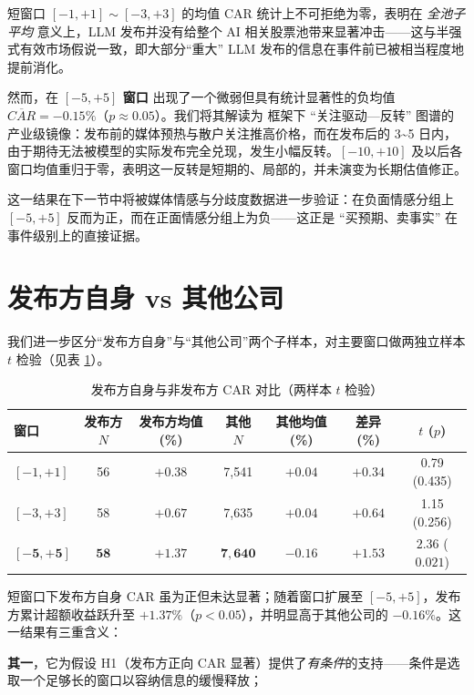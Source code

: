 \documentclass[11pt]{ctexart}
\begin{document}
短窗口 $[-1,+1]\sim[-3,+3]$ 的均值 CAR 统计上不可拒绝为零，表明在 \emph{全池子平均} 意义上，LLM 发布并没有给整个 AI 相关股票池带来显著冲击——这与半强式有效市场假说一致，即大部分“重大” LLM 发布的信息在事件前已被相当程度地提前消化。

然而，在 \textbf{$[-5,+5]$ 窗口} 出现了一个微弱但具有统计显著性的负均值 $\overline{CAR}=-0.15\%$（$p\approx 0.05$）。我们将其解读为 \cite{DaEngelbergGao2011} 框架下 “关注驱动—反转” 图谱的产业级镜像：发布前的媒体预热与散户关注推高价格，而在发布后的 3\textasciitilde 5 日内，由于期待无法被模型的实际发布完全兑现，发生小幅反转。$[-10,+10]$ 及以后各窗口均值重归于零，表明这一反转是短期的、局部的，并未演变为长期估值修正。

这一结果在下一节中将被媒体情感与分歧度数据进一步验证：在负面情感分组上 $[-5,+5]$ 反而为正，而在正面情感分组上为负——这正是 “买预期、卖事实” 在事件级别上的直接证据。

\section{发布方自身 vs 其他公司}
\label{sec:publisher_self}

我们进一步区分“发布方自身”与“其他公司”两个子样本，对主要窗口做两独立样本 $t$ 检验（见表 \ref{tab:pub_self}）。

\begin{table}[htbp]
\centering
\caption{发布方自身与非发布方 CAR 对比（两样本 $t$ 检验）}
\label{tab:pub_self}
\small
\begin{tabular}{lcccccc}
\toprule
窗口 & 发布方 $N$ & 发布方均值 (\%) & 其他 $N$ & 其他均值 (\%) & 差异 (\%) & $t$ ($p$) \\
\midrule
$[-1,+1]$ & 56 & $+0.38$ & 7{,}541 & $+0.04$ & $+0.34$ & 0.79 (0.435) \\
$[-3,+3]$ & 58 & $+0.67$ & 7{,}635 & $+0.04$ & $+0.64$ & 1.15 (0.256) \\
$\mathbf{[-5,+5]}$ & $\mathbf{58}$ & $\mathbf{+1.37}$ & $\mathbf{7{,}640}$ & $\mathbf{-0.16}$ & $\mathbf{+1.53}$ & $\mathbf{2.36}$ ($\mathbf{0.021}$) \\
\bottomrule
\end{tabular}
\end{table}

短窗口下发布方自身 CAR 虽为正但未达显著；随着窗口扩展至 $[-5,+5]$，发布方累计超额收益跃升至 $+1.37\%$（$p<0.05$），并明显高于其他公司的 $-0.16\%$。这一结果有三重含义：

\textbf{其一}，它为假设 H1（发布方正向 CAR 显著）提供了\emph{有条件}的支持——条件是选取一个足够长的窗口以容纳信息的缓慢释放；
\end{document}
